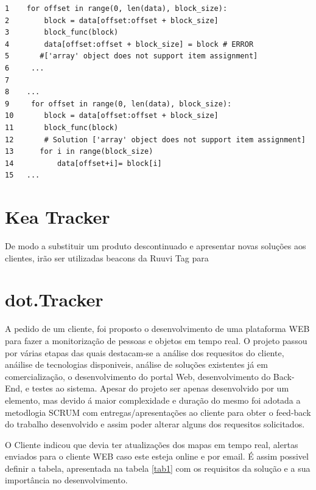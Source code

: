 \begin{verbatim}
1    for offset in range(0, len(data), block_size):
2        block = data[offset:offset + block_size]
3        block_func(block)
4        data[offset:offset + block_size] = block # ERROR 
5       #['array' object does not support item assignment]
6     ...
7
8    ...
9     for offset in range(0, len(data), block_size):
10       block = data[offset:offset + block_size]
11       block_func(block)
12       # Solution ['array' object does not support item assignment]
13      for i in range(block_size)
14          data[offset+i]= block[i]
15   ...
 \end{verbatim}

\section {Kea Tracker}

\par De modo a substituir um produto descontinuado e apresentar novas soluções aos clientes, irão ser utilizadas beacons da Ruuvi Tag para



\section {dot.Tracker}
\par
A pedido de um cliente, foi proposto o desenvolvimento de uma plataforma WEB para fazer a monitorização de pessoas e objetos em tempo real. O projeto passou por várias  etapas das quais destacam-se a análise dos requesitos do cliente, anáilise de tecnologias disponiveis, análise de soluções existentes já em comercialização, o desenvolvimento do portal Web, desenvolvimento do Back-End, e testes ao sistema. Apesar do projeto ser apenas desenvolvido por um elemento, mas devido á maior complexidade e duração do mesmo foi adotada a metodlogia SCRUM com entregas/apresentações ao cliente para obter o feed-back do trabalho desenvolvido e assim poder alterar alguns dos requesitos solicitados.
\par O Cliente indicou que devia ter atualizações dos mapas em tempo real, alertas enviados para o cliente WEB caso este esteja online e por email.
É assim possivel definir a tabela, apresentada na tabela \ref{tab1} com os requisitos da solução e a sua importância no desenvolvimento.

